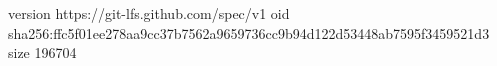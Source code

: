 version https://git-lfs.github.com/spec/v1
oid sha256:ffc5f01ee278aa9cc37b7562a9659736cc9b94d122d53448ab7595f3459521d3
size 196704
